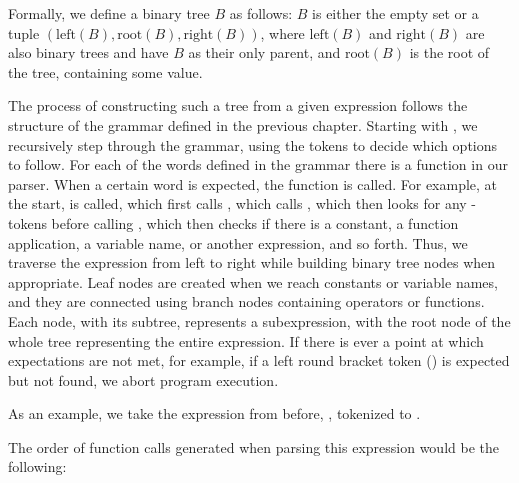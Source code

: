 \documentclass[12pt, a4paper]{report}
\begin{document}
Formally, we define a binary tree $B$ as follows:
$B$ is either the empty set or a tuple $(\text{left}(B),\text{root}(B),\text{right}(B))$, where $\text{left}(B)$ and $\text{right}(B)$ are also binary trees and have $B$ as their only parent, and $\text{root}(B)$ is the root of the tree, containing some value.

The process  of constructing such a tree from a given expression follows the structure of the grammar defined in the previous chapter.
Starting with , we recursively step through the grammar, using the tokens to decide which options to follow.
For each of the words defined in the grammar there is a function in our parser.
When a certain word is expected, the function is called.
For example, at the start,  is called, which first calls , which calls , which then looks for any -tokens before calling , which then checks if there is a constant, a function application, a variable name, or another expression, and so forth.
Thus, we traverse the expression from left to right while building binary tree nodes when appropriate.
Leaf nodes are created when we reach constants or variable names, and they are connected using branch nodes containing operators or functions.
Each node, with its subtree, represents a subexpression, with the root node of the whole tree representing the entire expression.
If there is ever a point at which expectations are not met, for example, if a left round bracket token () is expected but not found, we abort program execution.

As an example, we take the expression from before, , tokenized to .

The order of function calls generated when parsing this expression would be the following:
\end{document}
